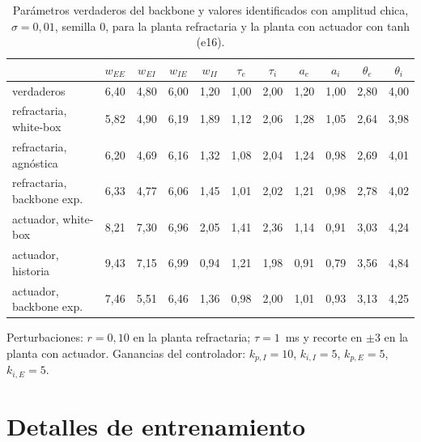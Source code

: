 \documentclass[11pt,a4paper]{article}
\begin{document}
\begin{table}[H]
\centering
\small
\caption{Parámetros verdaderos del backbone y valores identificados con amplitud chica, $\sigma = 0{,}01$, semilla 0, para la planta refractaria y la planta con actuador con tanh (e16).}
\begin{tabular}{@{}lcccccccccc@{}}
\toprule
& $w_{EE}$ & $w_{EI}$ & $w_{IE}$ & $w_{II}$ & $\tau_e$ & $\tau_i$ & $a_e$ & $a_i$ & $\theta_e$ & $\theta_i$ \\
\midrule
verdaderos & 6,40 & 4,80 & 6,00 & 1,20 & 1,00 & 2,00 & 1,20 & 1,00 & 2,80 & 4,00 \\
\midrule
refractaria, white-box & 5,82 & 4,90 & 6,19 & 1,89 & 1,12 & 2,06 & 1,28 & 1,05 & 2,64 & 3,98 \\
refractaria, agnóstica & 6,20 & 4,69 & 6,16 & 1,32 & 1,08 & 2,04 & 1,24 & 0,98 & 2,69 & 4,01 \\
refractaria, backbone exp. & 6,33 & 4,77 & 6,06 & 1,45 & 1,01 & 2,02 & 1,21 & 0,98 & 2,78 & 4,02 \\
actuador, white-box & 8,21 & 7,30 & 6,96 & 2,05 & 1,41 & 2,36 & 1,14 & 0,91 & 3,03 & 4,24 \\
actuador, historia & 9,43 & 7,15 & 6,99 & 0,94 & 1,21 & 1,98 & 0,91 & 0,79 & 3,56 & 4,84 \\
actuador, backbone exp. & 7,46 & 5,51 & 6,46 & 1,36 & 0,98 & 2,00 & 1,01 & 0,93 & 3,13 & 4,25 \\
\bottomrule
\end{tabular}
\end{table}

Perturbaciones: $r = 0{,}10$ en la planta refractaria; $\tau = 1$~ms y recorte en $\pm 3$ en la planta con actuador. Ganancias del controlador: $k_{p,I} = 10$, $k_{i,I} = 5$, $k_{p,E} = 5$, $k_{i,E} = 5$.

\section{Detalles de entrenamiento}
\end{document}
